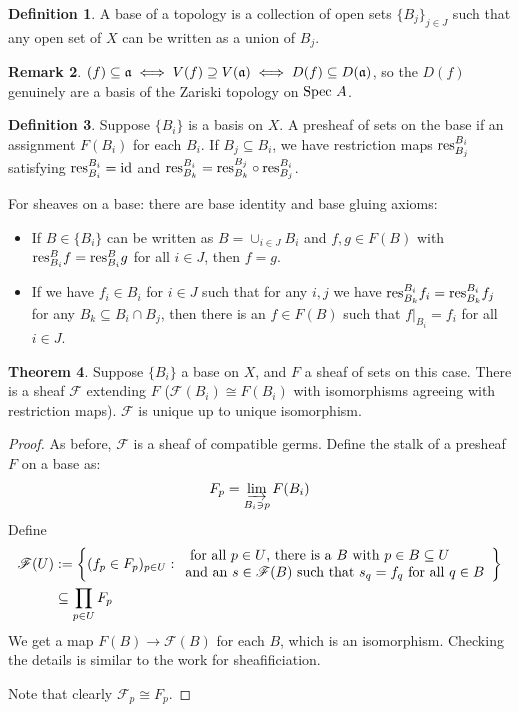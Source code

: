 \documentclass[10pt,reqno]{amsart}
\theoremstyle{definition}
\newtheorem{theorem}{Theorem}
\newtheorem{definition}[theorem]{Definition}
\newtheorem{remark}[theorem]{Remark}
\theoremstyle{remark}
\numberwithin{equation}{section}
\numberwithin{theorem}{section}
\newcommand{\res}{\textup{res}}
\newcommand{\spec}{\textup{Spec }}
\newcommand{\fraka}{\frak{a}}
\newcommand{\FF}{{\mathscr F}}
\begin{document}
\begin{definition} A base of a topology is a collection of open sets $\{B_j\}_{j \in J}$ such that any open set of $X$ can be written as a union of $B_j$.
\end{definition}

\begin{remark} $(f) \subseteq \fraka \iff V(f) \supseteq V(\fraka) \iff D(f) \subseteq D(\fraka)$, so the $D(f)$ genuinely are a basis of the Zariski topology on $\spec A$.
\end{remark}

\begin{definition} Suppose $\{B_i\}$ is a basis on $X$. A presheaf of sets on the base if an assignment $F(B_i)$ for each $B_i$. If $B_j \subseteq B_i$, we have restriction maps $\res^{B_i}_{B_j}$ satisfying $\res^{B_i}_{B_i} = \textup{id}$ and $\res^{B_i}_{B_k} = \res^{B_j}_{B_k} \circ \res^{B_i}_{B_j}$. 

For sheaves on a base: there are base identity and base gluing axioms:
\begin{itemize}
\item If $B \in \{B_i\}$ can be written as $B = \cup_{i \in J} B_i$ and $f,g \in F(B)$ with $\res^B_{B_i} f = \res^B_{B_i} g$ for all $i \in J$, then $f=g$.
\item If we have $f_i \in B_i$ for $i \in J$ such that for any $i,j$ we have $\res^{B_i}_{B_k} f_i = \res^{B_i}_{B_k} f_j$ for any $B_k \subseteq B_i \cap B_j$, then there is an $f \in F(B)$ such that $f|_{B_i} = f_i$ for all $i \in J$.
\end{itemize}
\end{definition}

\begin{theorem} Suppose $\{B_i\}$ a base on $X$, and $F$ a sheaf of sets on this case. There is a sheaf $\FF$ extending $F$ ($\FF(B_i) \cong F(B_i)$ with isomorphisms agreeing with restriction maps). $\FF$ is unique up to unique isomorphism.
\end{theorem}
\begin{proof}
As before, $\FF$ is a sheaf of compatible germs. Define the stalk of a presheaf $F$ on a base as:
\[F_p = \varinjlim_{B_i \ni p} F(B_i)\]
Define
\begin{align*}
\FF(U) &:= \left\{(f_p \in F_p)_{p \in U} : \begin{array}{l} \textup{ for all $p \in U$, there is a $B$ with $p \in B \subseteq U$} \\ \textup{and an $s \in \FF(B)$ such that $s_q = f_q$ for all $q \in B$}\end{array}\right\}\\
& \subseteq \prod_{p \in U}F_p
\end{align*}
We get a map $F(B) \to \FF(B)$ for each $B$, which is an isomorphism. Checking the details is similar to the work for sheafificiation.

Note that clearly $\FF_p \cong F_p$.
\end{proof}
\end{document}
